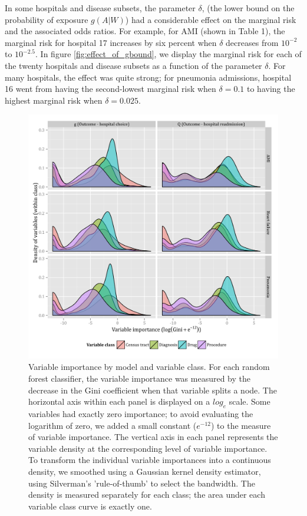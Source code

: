 \documentclass[]{article}\usepackage[]{graphicx}\usepackage[]{color}
\begin{document}
In some hospitals and disease subsets, the parameter $\delta$, (the lower bound on the probability of exposure $g(A|W)$) had a considerable effect on the marginal risk and the associated odds ratios. For example, for AMI (shown in Table 1), the marginal risk for hospital 17 increases by six percent when $\delta$ decreases from $10^{-2}$ to $10^{-2.5}$. In figure \ref{fig:effect_of_gbound}, we display the marginal risk for each of the twenty hospitals and disease subsets as a function of the parameter $\delta$. For many hospitals, the effect was quite strong; for pneumonia admissions, hospital 16 went from having the second-lowest marginal risk when $\delta=0.1$ to having the highest marginal risk when $\delta=0.025$.


\begin{figure}[H]
    \includegraphics{../figures/variable_importance_by_model_and_class.png}
    \caption[Error rate for random forest model of hospital choice.]
{Variable importance by model and variable class. For each random forest classifier, the variable importance was measured by the decrease in the Gini coefficient when that variable splits a node. The horizontal axis within each panel is displayed on a $log_e$ scale. Some variables had exactly zero importance; to avoid evaluating the logarithm of zero, we added a small constant ($e^{-12}$) to the measure of variable importance. The vertical axis in each panel represents the variable density at the corresponding level of variable importance. To transform the individual variable importances into a continuous density, we smoothed using a Gaussian kernel density estimator, using Silverman's 'rule-of-thumb' \supercite{silverman_density_1986} to select the bandwidth. The density is measured separately for each class; the area under each variable class curve is exactly one.
}
   \label{fig:variable_importance_by_model_and_class}
\end{figure}
\end{document}
